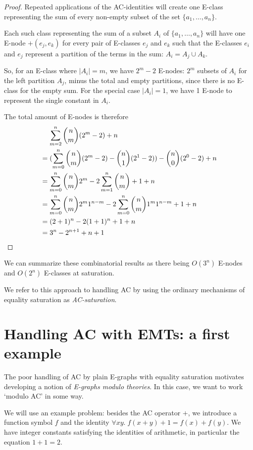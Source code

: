 \documentclass[12pt,a4paper,twoside,openright]{report}
\numberwithin{equation}{chapter}		%
\numberwithin{figure}{chapter}			%
\numberwithin{table}{chapter}			%
\theoremstyle{definition}
\theoremstyle{plain}
\begin{document}
\begin{proof}
Repeated applications of the AC-identities will create one E-class representing the sum of every non-empty subset of the set $\{a_1, \ldots, a_n\}$.

Each such class representing the sum of a subset $A_i$ of $\{a_1, \ldots, a_n\}$ will have one E-node $+(e_j, e_k)$ for every pair of E-classes $e_j$ and $e_k$ such that the E-classes $e_i$ and $e_j$ represent a partition of the terms in the sum: $A_i = A_j \cup A_k$.

So, for an E-class where $|A_i| = m$, we have $2^m - 2$ E-nodes: $2^m$ subsets of $A_i$ for the left partition $A_j$, minus the total and empty partitions, since there is no E-class for the empty sum. For the special case $|A_i| = 1$, we have 1 E-node to represent the single constant in $A_i$.

The total amount of E-nodes is therefore 
\begin{align*}
	&\mathrel{\hphantom{=}} \sum_{m=2}^n \binom{n}{m}(2^m - 2) + n \\
	&= (\sum_{m=0}^n \binom{n}{m}(2^m - 2) - \binom{n}{1}(2^1 - 2)) - \binom{n}{0}(2^0 - 2) + n \\
	&= \sum_{m=0}^n \binom{n}{m} 2^m - 2 \sum_{m=1}^n \binom{n}{m} + 1 + n \\
	&= \sum_{m=0}^n \binom{n}{m} 2^m 1^{n-m} - 2 \sum_{m=0}^n \binom{n}{m} 1^m 1^{n-m} + 1 + n \\
	&= (2 + 1)^n - 2(1 + 1)^n + 1 + n \\
	&= 3^n - 2^{n+1} + n + 1
\end{align*}
\end{proof}
We can summarize these combinatorial results as there being $O(3^n)$ E-nodes and $O(2^n)$ E-classes at saturation.

We refer to this approach to handling AC by using the ordinary mechanisms of equality saturation as \emph{AC-saturation}.

\section{Handling AC with EMTs: a first example}
The poor handling of AC by plain E-graphs with equality saturation motivates developing a notion of \emph{E-graphs modulo theories}. In this case, we want to work `modulo AC' in some way.

We will use an example problem: besides the AC operator $+$, we introduce a function symbol $f$ and the identity $\forall xy.\; f(x + y) + 1 = f(x) + f(y)$. We have integer constants satisfying the identities of arithmetic, in particular the equation $1 + 1 = 2$.
\end{document}
